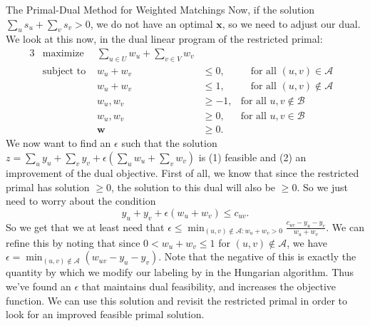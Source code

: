 \begin{section}{The Primal-Dual Method for Weighted Matchings}
	Now, if the solution $\sum_u s_u + \sum_v s_v > 0$, we do not have an optimal $\mathbf{x}$, 
	so we need to adjust our dual. We look at this now, in the dual linear program of the 
	restricted primal:
	\begin{alignat}{3}
		& \text{maximize } & \sum_{u\in U} w_u + \sum_{v\in V} w_v & \\
		& \text{subject to } & w_u + w_v & \leq 0, & \quad \text{for all } (u,v)\in 
					\mathcal{A} & \\
				     && w_u + w_v & \leq 1, & \quad \text{for all } (u,v)\notin 
				     	\mathcal{A} & \\
				     && w_u,w_v & \geq -1, & \text{for all } u,v\notin 
				     	\mathcal{B} \\
				     && w_u,w_v & \geq 0, & \text{for all } u,v\in \mathcal{B} \\
				     && \mathbf{w} & \geq 0.
	\end{alignat}
	We now want to find an $\epsilon$ such that the solution $z = \sum_u y_u + \sum_v y_v + 
	\epsilon (\sum_u w_u + \sum_v w_v)$ is (1) feasible and (2) an improvement of the dual 
	objective. First of all, we know that since the restricted primal has solution $\geq 0$, 
	the solution to this dual will also be $\geq 0$. So we just need to worry about the condition 
	\[
		y_u + y_v + \epsilon (w_u + w_v) \leq c_{uv}.
	\]
	So we get that we at least need that $\epsilon \leq \min_{(u,v)\notin \mathcal{A}: w_u + w_v > 0}
	\frac{c_{uv} - y_u - y_v}{w_u + w_v}$. We can refine this by noting that since 
	$0 < w_u + w_v \leq 1$ for $(u,v)\notin \mathcal{A}$, we have 
	$\epsilon = \min_{(u,v)\notin \mathcal{A}} 
	(w_{uv} - y_u - y_v)$. Note that the negative of this is exactly the quantity by which we 
	modify our labeling by in the Hungarian algorithm. Thus we've found an 
	$\epsilon$ that maintains dual feasibility, and increases the objective function. We can use 
	this solution and revisit the restricted primal in order to look for an improved feasible 
	primal solution.
\end{section}


